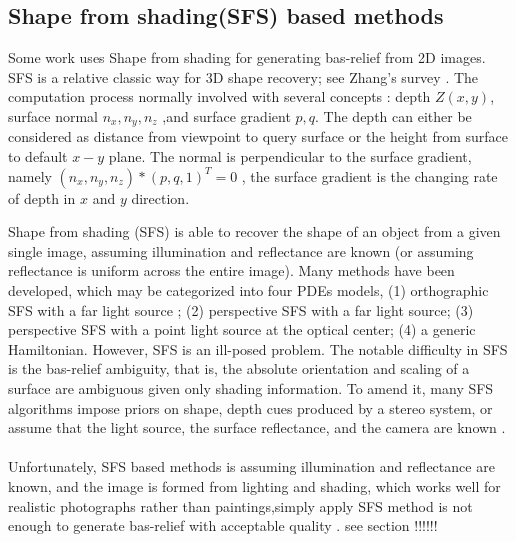 \subsection{Shape from shading(SFS) based methods}
Some work uses Shape from shading for generating  bas-relief from 2D images. SFS is a relative classic way for 3D shape recovery; see Zhang's survey \cite{zhang1999shape}.  The computation process normally involved with several concepts : depth $Z(x,y)$, surface normal $n_x,n_y,n_z$ ,and surface gradient $p,q$. The depth can either be considered as distance from viewpoint to query surface or the height from surface to default $x-y$ plane. The normal is perpendicular to the surface gradient, namely $\left( n_x,n_y,n_z\right) * \left( p, q ,1\right)^T =0  $ , the surface gradient is the changing rate of depth in $x$ and $y$ direction.

Shape from shading (SFS) is able to recover the shape of an object from a given single image, assuming illumination and reflectance are known (or assuming reflectance is uniform across the entire image). Many methods have been developed, which may be categorized into four PDEs models\cite{prados2003perspective}, (1) orthographic SFS with a far light source \cite{lions1993shape}; (2) perspective SFS with a far light source\cite{prados2004unifying}; (3) perspective SFS with a point light source at the optical center\cite{prados2003perspective}; (4) a generic Hamiltonian. However, SFS is an ill-posed problem. The notable difficulty in SFS is the bas-relief ambiguity\cite{belhumeur1999bas}, that is, the absolute orientation and scaling of a surface are ambiguous given only shading information. To amend it, many SFS algorithms impose priors on shape, depth cues produced by a stereo system, or assume that the light source, the surface reflectance, and the camera are known\cite{zhang1999shape} \cite{alldrin2007resolving} \cite{johnson2011shape} \cite{barron2012color}.\\ \\
Unfortunately, SFS based methods is assuming illumination and reflectance are known, and the image is formed from lighting and shading, which works well for realistic photographs rather than paintings,simply apply SFS method is not enough to generate bas-relief with acceptable quality . see section  !!!!!!

